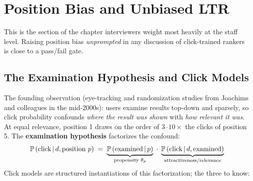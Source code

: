\section{Position Bias and Unbiased LTR}
\label{sr:sec:unbiased_ltr}

This is the section of the chapter interviewers weight most heavily at the staff level. Raising position bias \textit{unprompted} in any discussion of click-trained rankers is close to a pass/fail gate.

\subsection{The Examination Hypothesis and Click Models}

The founding observation (eye-tracking and randomization studies from Joachims and colleagues in the mid-2000s): users examine results top-down and sparsely, so click probability confounds \textit{where the result was shown} with \textit{how relevant it was}. At equal relevance, position 1 draws on the order of $3$--$10\times$ the clicks of position 5. The \textbf{examination hypothesis} factorizes the confound:
\begin{equation}
\mathbb{P}\left(\text{click} \,|\, d, \text{position } p\right) \;=\; \underbrace{\mathbb{P}\left(\text{examined} \,|\, p\right)}_{\text{propensity } \theta_p} \;\cdot\; \underbrace{\mathbb{P}\left(\text{click} \,|\, d, \text{examined}\right)}_{\text{attractiveness/relevance}}
\end{equation}
Click models are structured instantiations of this factorization; the three to know:

